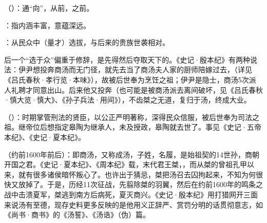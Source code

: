 {
\item {}（）：通“向”，从前，之前。
\item {}：指内涵丰富，意蕴深远。
\item {}：从民众中（量才）选拔，与后来的贵族世袭相对。

后一个“选于众”偏重于修辞，是先得然后夺取天下的。《史记·殷本纪》有两种说法：伊尹想投奔商汤而无门径，就先去当了商汤夫人家的厨师陪嫁过去，（详见《吕氏春秋·孝行览·本味》），故被后世奉为烹饪之祖；伊尹是隐士，商汤5次派人礼聘才同意出山。后来他又投奔（也可能是被商汤派去离间破坏，见《吕氏春秋·慎大览·慎大》、《孙子兵法·用间》），不齿桀之无道，复归于汤，终成大业。

\item {}（）：时期掌管刑法的贤臣，以公正严明著称，深得民众信服，被后世奉为司法之祖。继帝位后想指定皋陶为继承人，未及授政，皋陶就去世了。事见《史记·五帝本纪》、《史记·夏本纪》。%

\item {}（约前1600年前后）：即商汤，又称成汤，子姓，名履，是始祖契的14世孙，商朝开国之君。《史记·夏本纪》、《周本纪》载，末代君王桀，，而从桀的曾祖孔甲以来，就有很多诸侯暗怀叛心了。也许出于猜忌，桀把汤召去囚拘起来，不知为何很快又放掉了。于是，历经11次征战，先翦除桀的羽翼，然后在约前1600年的鸣条之战中击溃夏军，桀逃到南方后病死，夏灭商兴。《史记·殷本纪》用打猎网开三面来说汤有至德，现存史料更多反映的是他用义正辞严、赏罚分明的话贯彻意志，如《尚书·商书》的《汤誓》、《汤诰》（伪）篇。

}
